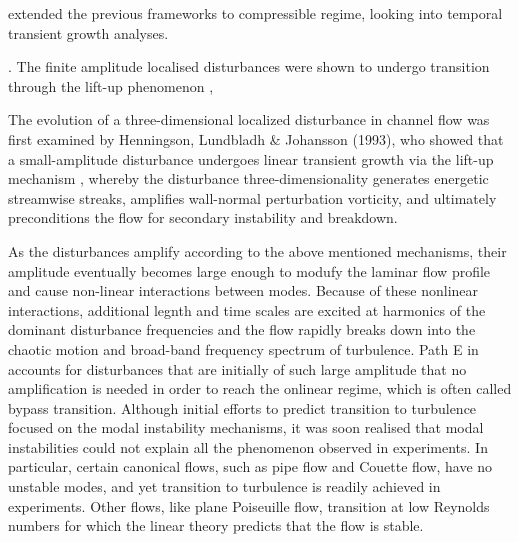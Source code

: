 \cite{Hanifi1996} extended the previous frameworks to compressible regime, looking into temporal transient growth analyses. 

. The finite amplitude localised disturbances were shown to undergo transition through the lift-up phenomenon \citep{Landahl1975}, 



The evolution of a three-dimensional localized disturbance in channel flow was first examined by Henningson, Lundbladh \& Johansson (1993), who showed that a small-amplitude disturbance undergoes linear transient growth via the lift-up mechanism \citep{Landahl1975}, whereby the disturbance three-dimensionality generates energetic streamwise streaks, amplifies wall-normal perturbation vorticity, and ultimately preconditions the flow for secondary instability and breakdown.







As the disturbances amplify according to the above mentioned mechanisms, their amplitude eventually becomes large enough to modufy the laminar flow profile and cause non-linear interactions between modes. Because of these nonlinear interactions, additional legnth and time scales are excited at harmonics of the dominant disturbance frequencies and the flow rapidly breaks down into the chaotic motion and broad-band frequency spectrum of turbulence. Path E in  accounts for disturbances that are initially of such large amplitude that no amplification is needed in order to reach the onlinear regime, which is often called bypass transition. Although initial efforts to predict transition to turbulence focused on the modal instability mechanisms, it was soon realised that modal instabilities could not explain all the phenomenon observed in experiments. In particular, certain canonical flows, such as pipe flow and Couette flow, have no unstable modes, and yet transition to turbulence is readily achieved in experiments. Other flows, like plane Poiseuille flow, transition at low Reynolds numbers for which the linear theory predicts that the flow is stable. 

